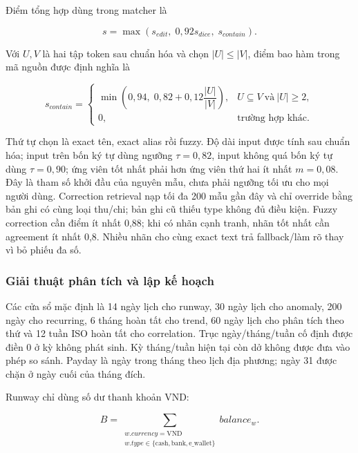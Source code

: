 Điểm tổng hợp dùng trong matcher là

\begin{equation}
  s=\max(s_{edit},\;0{,}92s_{dice},\;s_{contain}).
\end{equation}

Với $U,V$ là hai tập token sau chuẩn hóa và chọn $|U|\leq|V|$, điểm bao hàm trong mã nguồn được định nghĩa là

\begin{equation}
  s_{contain}=\begin{cases}
    \min\!\left(0{,}94,\;0{,}82+0{,}12\dfrac{|U|}{|V|}\right),
      & U\subseteq V\ \text{và}\ |U|\geq2,\\
    0, & \text{trường hợp khác}.
  \end{cases}
\end{equation}

Thứ tự chọn là exact tên, exact alias rồi fuzzy. Độ dài input được tính sau chuẩn hóa; input trên bốn ký tự dùng ngưỡng $\tau=0{,}82$, input không quá bốn ký tự dùng $\tau=0{,}90$; ứng viên tốt nhất phải hơn ứng viên thứ hai ít nhất $m=0{,}08$. Đây là tham số khởi đầu của nguyên mẫu, chưa phải ngưỡng tối ưu cho mọi người dùng. Correction retrieval nạp tối đa 200 mẫu gần đây và chỉ override bằng bản ghi có cùng loại thu/chi; bản ghi cũ thiếu type không đủ điều kiện. Fuzzy correction cần điểm ít nhất 0,88; khi có nhãn cạnh tranh, nhãn tốt nhất cần agreement ít nhất 0,8. Nhiều nhãn cho cùng exact text trả fallback/làm rõ thay vì bỏ phiếu đa số.

\subsubsection{Giải thuật phân tích và lập kế hoạch}
\label{subsec:analytics-design}

Các cửa sổ mặc định là 14 ngày lịch cho runway, 30 ngày lịch cho anomaly, 200 ngày cho recurring, 6 tháng hoàn tất cho trend, 60 ngày lịch cho phân tích theo thứ và 12 tuần ISO hoàn tất cho correlation. Trục ngày/tháng/tuần cố định được điền 0 ở kỳ không phát sinh. Kỳ tháng/tuần hiện tại còn dở không được đưa vào phép so sánh. Payday là ngày trong tháng theo lịch địa phương; ngày 31 được chặn ở ngày cuối của tháng đích.

Runway chỉ dùng số dư thanh khoản VND:

\begin{equation}
  B=\sum_{\substack{w.currency=\mathrm{VND}\\
  w.type\in\{\mathrm{cash},\mathrm{bank},\mathrm{e\_wallet}\}}} balance_w.
\end{equation}

